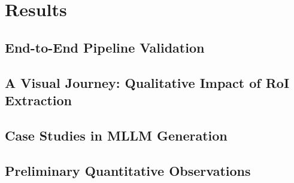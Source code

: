 \chapter{Results}
\section{End-to-End Pipeline Validation}

\section{A Visual Journey: Qualitative Impact of RoI Extraction}

\section{Case Studies in MLLM Generation}

\section{Preliminary Quantitative Observations}


